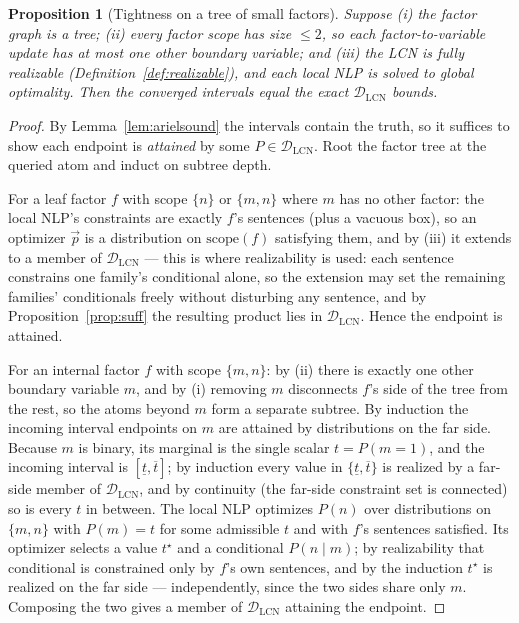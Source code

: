 \documentclass[11pt]{article}
\newtheorem{proposition}{Proposition}
\theoremstyle{definition}
\newcommand{\lo}{\underline}
\newcommand{\hi}{\overline}
\newcommand{\DLCN}{\mathcal{D}_{\mathrm{LCN}}}
\begin{document}
\begin{proposition}[Tightness on a tree of small factors]\label{prop:arieltight}
Suppose (i) the factor graph is a tree; (ii) every factor scope has size $\le2$, so each
factor-to-variable update has at most one other boundary variable; and (iii) the LCN is fully
realizable (Definition~\ref{def:realizable}), and each local NLP is solved to global optimality. Then
the converged intervals equal the exact $\DLCN$ bounds.
\end{proposition}

\begin{proof}
By Lemma~\ref{lem:arielsound} the intervals contain the truth, so it suffices to show each endpoint is
\emph{attained} by some $P\in\DLCN$. Root the factor tree at the queried atom and induct on subtree
depth.

For a leaf factor $f$ with scope $\{n\}$ or $\{m,n\}$ where $m$ has no other factor: the local NLP's
constraints are exactly $f$'s sentences (plus a vacuous box), so an optimizer $\vec p$ is a
distribution on $\mathrm{scope}(f)$ satisfying them, and by (iii) it extends to a member of $\DLCN$ ---
this is where realizability is used: each sentence constrains one family's conditional alone, so the
extension may set the remaining families' conditionals freely without disturbing any sentence, and by
Proposition~\ref{prop:suff} the resulting product lies in $\DLCN$. Hence the endpoint is attained.

For an internal factor $f$ with scope $\{m,n\}$: by (ii) there is exactly one other boundary variable
$m$, and by (i) removing $m$ disconnects $f$'s side of the tree from the rest, so the atoms beyond $m$
form a separate subtree. By induction the incoming interval endpoints on $m$ are attained by
distributions on the far side. Because $m$ is binary, its marginal is the single scalar
$t=P(m{=}1)$, and the incoming interval is $[\lo t,\hi t]$; by induction every value in
$\{\lo t,\hi t\}$ is realized by a far-side member of $\DLCN$, and by continuity (the far-side
constraint set is connected) so is every $t$ in between. The local NLP optimizes $P(n)$ over
distributions on $\{m,n\}$ with $P(m)=t$ for some admissible $t$ and with $f$'s sentences satisfied.
Its optimizer selects a value $t^\star$ and a conditional $P(n\mid m)$; by realizability that
conditional is constrained only by $f$'s own sentences, and by the induction $t^\star$ is realized on
the far side --- independently, since the two sides share only $m$. Composing the two gives a member of
$\DLCN$ attaining the endpoint.
\end{proof}
\end{document}
